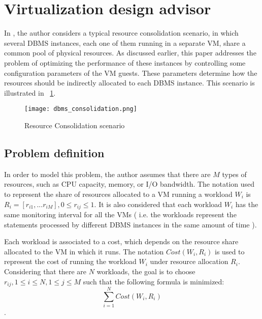 \section{Virtualization design advisor}

\label{chap:virtualization}


In \cite{Soror:2008:AVM:1376616.1376711}, the author considers a typical resource consolidation scenario, in which several DBMS instances, each one of them running in a separate VM, share a common pool of physical resources. As discussed earlier, this paper addresses the problem of optimizing the performance of these instances by controlling some configuration parameters of the VM guests. These parameters determine how the resources should be indirectly allocated to each DBMS instance. This scenario is illustrated in ~\ref{fig:scenario}.


\begin{figure}[ht]
\centering
\texttt{[image: dbms\_consolidation.png]}
\caption{Resource Consolidation scenario}
\label{fig:scenario}
\end{figure} 

\subsection{Problem definition}

In order to model this problem, the author assumes that there are  $M$ types of resources, such as CPU capacity, memory, or I/O bandwidth. The notation used to represent the share of resources allocated to a VM running a workload $W_{i}$ is $R_{i} = [r_{i1},...r_{iM}], 0 \leq r_{ij} \leq 1$. It is also considered that each workload $W_{i}$ has the same monitoring interval for all the VMs ( i.e. the workloads represent the statements processed by different DBMS instances in the same amount of time ).

Each workload is associated to a cost, which depends on the resource share allocated to the VM in which it runs. The notation $Cost(W_{i},R_{i})$ is used to represent the cost of running the workload $W_{i}$ under resource allocation $R_{i}$. Considering that there are $N$ workloads, the goal is to choose $r_{ij}, 1 \leq i \leq N, 1 \leq j \leq M$ such that the following formula is minimized:
\[
  \sum_{i=1}^{N} Cost(W_{i},R_{i})
\].

